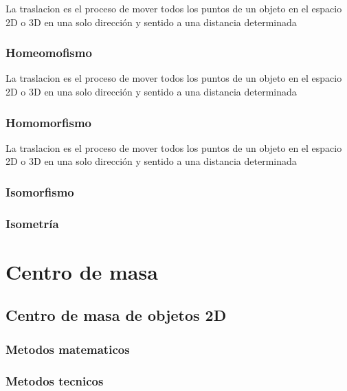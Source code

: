 \documentclass[
  16pt,
]{krantz}
\theoremstyle{definition}
\theoremstyle{definition}
\theoremstyle{definition}
\theoremstyle{definition}
\theoremstyle{remark}
\begin{document}
La traslacion es el proceso de mover todos los puntos de un objeto en el espacio 2D o 3D en una solo dirección y sentido a una distancia determinada

\hypertarget{homeomofismo}{%
\subsection{Homeomofismo}\label{homeomofismo}}

La traslacion es el proceso de mover todos los puntos de un objeto en el espacio 2D o 3D en una solo dirección y sentido a una distancia determinada

\hypertarget{homomorfismo}{%
\subsection{Homomorfismo}\label{homomorfismo}}

La traslacion es el proceso de mover todos los puntos de un objeto en el espacio 2D o 3D en una solo dirección y sentido a una distancia determinada \citep{xie2015}

\hypertarget{isomorfismo}{%
\subsection{Isomorfismo}\label{isomorfismo}}

\hypertarget{isometruxeda}{%
\subsection{Isometría}\label{isometruxeda}}

\hypertarget{centro-de-masa}{%
\chapter{Centro de masa}\label{centro-de-masa}}

\hypertarget{centro-de-masa-de-objetos-2d}{%
\section{Centro de masa de objetos 2D}\label{centro-de-masa-de-objetos-2d}}

\hypertarget{metodos-matematicos}{%
\subsection{Metodos matematicos}\label{metodos-matematicos}}

\hypertarget{metodos-tecnicos}{%
\subsection{Metodos tecnicos}\label{metodos-tecnicos}}
\end{document}
